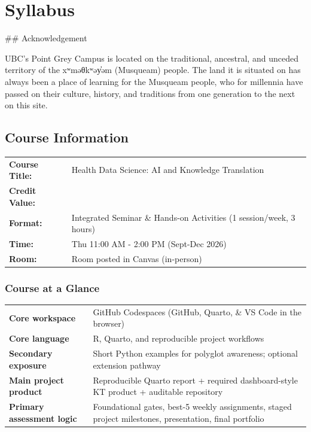 \documentclass[
  letterpaper,
  DIV=11,
  numbers=noendperiod,
  oneside]{scrreprt}
\begin{document}
\chapter{Syllabus}\label{syllabus}

\#\# Acknowledgement

UBC's Point Grey Campus is located on the traditional, ancestral, and
unceded territory of the xʷməθkʷəy̓əm (Musqueam) people. The land it is
situated on has always been a place of learning for the Musqueam people,
who for millennia have passed on their culture, history, and traditions
from one generation to the next on this site.

\section{Course Information}\label{course-information}

\begin{tabular}{>{\raggedleft\arraybackslash}p{3cm}>{\raggedright\arraybackslash}p{12cm}}
\toprule
\textcolor{brandblue}{\textbf{Course Title:}} & Health Data Science: AI and Knowledge Translation\\
\textcolor{brandblue}{\textbf{Credit Value:}} & 3\\
\textcolor{brandblue}{\textbf{Format:}} & Integrated Seminar \& Hands-on Activities (1 session/week, 3 hours)\\
\textcolor{brandblue}{\textbf{Time:}} & Thu 11:00 AM - 2:00 PM (Sept-Dec 2026)\\
\textcolor{brandblue}{\textbf{Room:}} & Room posted in Canvas (in-person)\\
\bottomrule
\end{tabular}

\subsection{Course at a Glance}\label{course-at-a-glance}

\begin{tabular}{>{\raggedleft\arraybackslash}p{4cm}>{\raggedright\arraybackslash}p{11cm}}
\toprule
\textcolor{brandblue}{\textbf{Core workspace}} & GitHub Codespaces (GitHub, Quarto, \& VS Code in the browser)\\
\textcolor{brandblue}{\textbf{Core language}} & R, Quarto, and reproducible project workflows\\
\textcolor{brandblue}{\textbf{Secondary exposure}} & Short Python examples for polyglot awareness; optional extension pathway\\
\textcolor{brandblue}{\textbf{Main project product}} & Reproducible Quarto report + required dashboard-style KT product + auditable repository\\
\textcolor{brandblue}{\textbf{Primary assessment logic}} & Foundational gates, best-5 weekly assignments, staged project milestones, presentation, final portfolio\\
\bottomrule
\end{tabular}
\end{document}
